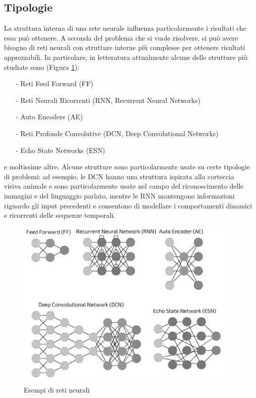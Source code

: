\subsection*{Tipologie} La struttura interna di una rete neurale influenza particolarmente i risultati che essa può ottenere. A seconda del problema che si vuole risolvere, si può avere bisogno di reti neurali con strutture interne più complesse per ottenere risultati apprezzabili. In particolare, in letteratura attualmente alcune delle strutture più studiate sono (Figura \ref{fig:tipologiereti}):
\begin{itemize}
    \item[-] Reti Feed Forward (FF)
    \item[-] Reti Neurali Ricorrenti (RNN, Recurrent Neural Networks)
    \item[-] Auto Encoders (AE)
    \item[-] Reti Profonde Convolutive (DCN, Deep Convolutional Networks)
    \item[-] Echo State Networks (ESN)
\end{itemize}
e moltissime altre. Alcune strutture sono particolarmente usate su certe tipologie di problemi: ad esempio, le DCN hanno una struttura ispirata alla corteccia visiva animale e sono particolarmente usate nel campo del riconoscimento delle immagini e del linguaggio parlato, mentre le RNN mantengono informazioni riguardo gli input precedenti e consentono di modellare i comportamenti dinamici e ricorrenti delle sequenze temporali.
\begin{figure}[b]
	\begin{center}
		\includegraphics[width=0.95\textwidth]{img/tipologiereti.png}
		\caption{Esempi di reti neurali}
		\label{fig:tipologiereti}
	\end{center}
\end{figure}

